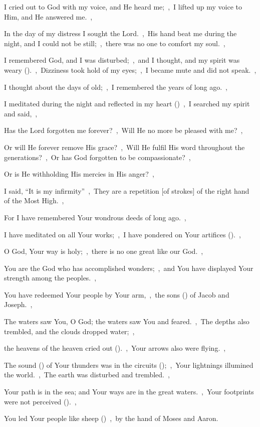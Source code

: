 \documentclass[12pt,twoside,a5paper]{article}
\begin{document}
\begin{normalparskip}
  I cried out to God with my voice, and He heard me;~\sep\ I lifted up my voice to Him, and He answered me.~\sep


  In the day of my distress I sought the Lord.~\sep\ His hand beat me during the night, and I could not be still;~\sep\ there was no one to comfort my soul.~\sep

  I remembered God, and I was disturbed;~\sep\ and I thought, and my spirit was weary ().~\sep\ Dizziness took hold of my eyes;~\sep\ I became mute and did not speak.~\sep

  I thought about the days of old;~\sep\ I remembered the years of long ago.~\sep

  I meditated during the night and reflected in my heart ()~\sep\ I searched my spirit and said,~\sep

  Has the Lord forgotten me forever?~\sep\ Will He no more be pleased with me?~\sep

  Or will He forever remove His grace?~\sep\ Will He fulfil His word throughout the generations?~\sep\ Or has God forgotten to be compassionate?~\sep

  Or is He withholding His mercies in His anger?~\sep

  I said, ``It is my infirmity''~\sep\ They are a repetition [of strokes] of the right hand of the Most High.~\sep

  For I have remembered Your wondrous deeds of long ago.~\sep

  I have meditated on all Your works;~\sep\ I have pondered on Your artifices ().~\sep

  O God, Your way is holy;~\sep\ there is no one great like our God.~\sep

  You are the God who has accomplished wonders;~\sep\ and You have displayed Your strength among the peoples.~\sep

  You have redeemed Your people by Your arm,~\sep\ the sons () of Jacob and Joseph.~\sep

  The waters saw You, O God; the waters saw You and feared.~\sep\ The depths also trembled, and the clouds dropped water;~\sep

  the heavens of the heaven cried out ().~\sep\ Your arrows also were flying.~\sep

  The sound () of Your thunders was in the circuits ();~\sep\ Your lightnings illumined the world.~\sep\ The earth was disturbed and trembled.~\sep

  Your path is in the sea; and Your ways are in the great waters.~\sep\ Your footprints were not perceived ().~\sep

  You led Your people like sheep ()~\sep\ by the hand of Moses and Aaron.
\end{normalparskip}
\end{document}
